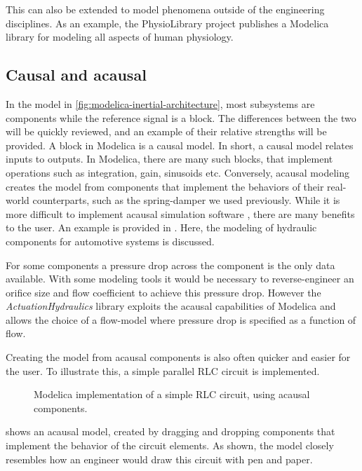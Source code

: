\documentclass[\rootfolder/main.tex]{subfiles}
\begin{document}
This can also be extended to model phenomena outside of the engineering disciplines.
As an example, the PhysioLibrary project publishes a Modelica library for modeling all aspects of human physiology.

\subsection{Causal and acausal}

In the model in \cref{fig:modelica-inertial-architecture}, most subsystems are components while the reference signal is a block.
The differences between the two will be quickly reviewed, and an example of their relative strengths will be provided.
A block in Modelica is a causal model.
In short, a causal model relates inputs to outputs.
In Modelica, there are many such blocks, that implement operations such as integration, gain, sinusoids etc.
Conversely, acausal modeling creates the model from components that implement the behaviors of their real-world counterparts, such as the spring-damper we used previously.
While it is more difficult to implement acausal simulation software \cite{tiller2001}, there are many benefits to the user.
An example is provided in \cite{harman2006}.
Here, the modeling of hydraulic components for automotive systems is discussed.

\begin{displayquote}
    For some components a pressure drop across the component is the only data available.
    With some modeling tools it would be necessary to reverse-engineer an orifice size and flow coefficient to achieve this pressure drop.
    However the \emph{ActuationHydraulics} library exploits the acausal capabilities of Modelica and allows the choice of a flow-model where pressure drop is specified as a function of flow.
\end{displayquote}

Creating the model from acausal components is also often quicker and easier for the user.
To illustrate this, a simple parallel RLC circuit is implemented.

\begin{wrapfigure}{R}{0.6\columnwidth}
    \caption{Modelica implementation of a simple RLC circuit, using acausal components.\label{fig:modelica-rlc-comp}}
\end{wrapfigure}

 shows an acausal model, created by dragging and dropping components that implement the behavior of the circuit elements.
As shown, the model closely resembles how an engineer would draw this circuit with pen and paper.
\end{document}
